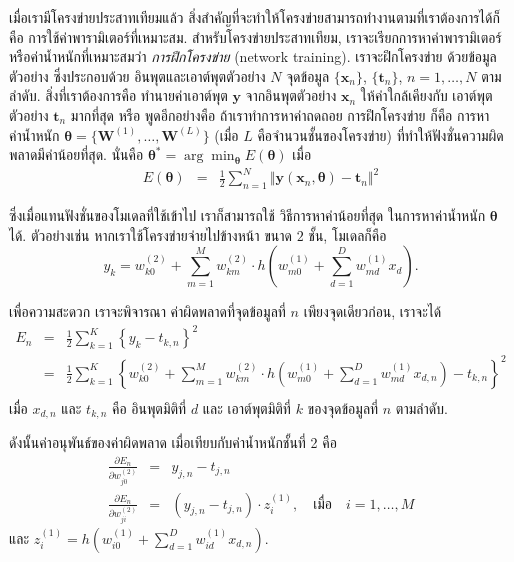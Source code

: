 เมื่อเรามีโครงข่ายประสาทเทียมแล้ว สิ่งสำคัญที่จะทำให้โครงข่ายสามารถทำงานตามที่เราต้องการได้ก็คือ การใช้ค่าพารามิเตอร์ที่เหมาะสม.
สำหรับโครงข่ายประสาทเทียม, เราจะเรียกการหาค่าพารามิเตอร์หรือค่าน้ำหนักที่เหมาะสมว่า \textit{การฝึกโครงข่าย} (network training).
เราจะฝึกโครงข่าย ด้วยข้อมูลตัวอย่าง ซึ่งประกอบด้วย อินพุตและเอาต์พุตตัวอย่าง $N$ จุดข้อมูล $\{\mathbf{x}_n\}$, $\{\mathbf{t}_n\}$, $n = 1, \ldots, N$ ตามลำดับ.
สิ่งที่เราต้องการคือ ทำนายค่าเอาต์พุต $\mathbf{y}$ จากอินพุตตัวอย่าง $\mathbf{x}_n$ ให้ค่าใกล้เคียงกับ เอาต์พุตตัวอย่าง $\mathbf{t}_n$ มากที่สุด หรือ พูดอีกอย่างคือ ถ้าเราทำการหาค่าถดถอย การฝึกโครงข่าย ก็คือ การหาค่าน้ำหนัก $\bm{\theta} = \{\mathbf{W}^{(1)}, \ldots, \mathbf{W}^{(L)} \}$ (เมื่อ $L$ คือจำนวนชั้นของโครงข่าย) ที่ทำให้ฟังชั่นความผิดพลาดมีค่าน้อยที่สุด.
นั่นคือ $\bm{\theta}^{\ast} = \arg \min_{\bm{\theta}} E(\bm{\theta})$ เมื่อ
\begin{eqnarray}
   E(\bm{\theta}) &=& \frac{1}{2} \sum_{n=1}^N \Vert \mathbf{y}(\mathbf{x}_n, \bm{\theta}) - \mathbf{t}_n \Vert^2
\label{eq: ANN error function}
\end{eqnarray}

ซึ่งเมื่อแทนฟังชั่นของโมเดลที่ใช้เข้าไป เราก็สามารถใช้ วิธีการหาค่าน้อยที่สุด ในการหาค่าน้ำหนัก $\bm{\theta}$ ได้.
ตัวอย่างเช่น หากเราใช้โครงข่ายจ่ายไปข้างหน้า ขนาด $2$ ชั้น,
โมเดลก็คือ
\[
   y_k = w^{(2)}_{k0} +\sum_{m=1}^M w^{(2)}_{km} \cdot h\left( w^{(1)}_{m0} + \sum_{d=1}^D w^{(1)}_{md} x_d \right).
\]

เพื่อความสะดวก เราจะพิจารณา ค่าผิดพลาดที่จุดข้อมูลที่ $n$ เพียงจุดเดียวก่อน, เราจะได้
\begin{eqnarray}
   E_n &=& \frac{1}{2} \sum_{k=1}^K \left\{ y_k - t_{k,n} \right\}^2
\label{eq: ANN En regression} \\   
   &=& \frac{1}{2} \sum_{k=1}^K \left\{ w^{(2)}_{k0} +\sum_{m=1}^M w^{(2)}_{km} \cdot h\left( w^{(1)}_{m0} + \sum_{d=1}^D w^{(1)}_{md} x_{d,n} \right) - t_{k,n} \right\}^2
   \nonumber \\
\label{eq: ANN En 2-layer regression}
\end{eqnarray}
เมื่อ $x_{d,n}$ และ $t_{k,n}$ คือ อินพุตมิติที่ $d$ และ เอาต์พุตมิติที่ $k$ ของจุดข้อมูลที่ $n$ ตามลำดับ.

ดังนั้นค่าอนุพันธ์ของค่าผิดพลาด เมื่อเทียบกับค่าน้ำหนักชั้นที่ 2 คือ
\begin{eqnarray}
   \frac{\partial E_n}{\partial w^{(2)}_{j0}} &=& y_{j,n} - t_{j,n}
\label{eq: ANN dEn/w2 0} \\   
   \frac{\partial E_n}{\partial w^{(2)}_{ji}} &=& (y_{j,n} - t_{j,n}) \cdot z_i^{(1)}, \quad \mbox{เมื่อ} \quad i = 1,\ldots,M
\label{eq: ANN dEn/w2 i}
\end{eqnarray}
และ $z_i^{(1)} = h\left( w^{(1)}_{i0} + \sum_{d=1}^D w^{(1)}_{id} x_{d,n} \right)$.

